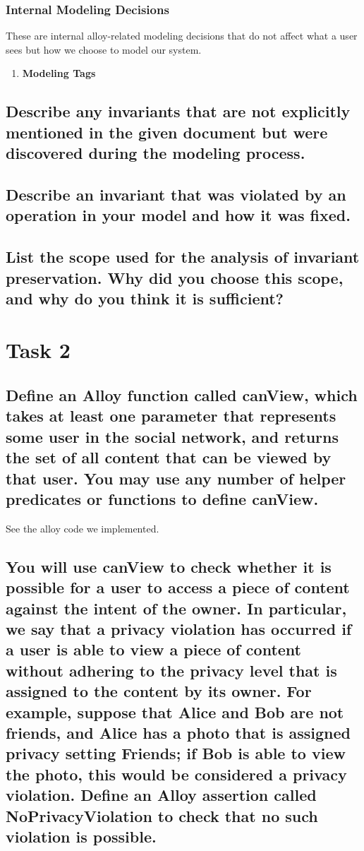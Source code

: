 \documentclass[titlepage]{article}
\begin{document}
\subsubsection{Internal Modeling Decisions}
These are internal alloy-related modeling decisions that do not affect what a user sees but how we choose to model our system.
\begin{enumerate}
	\item \textbf{Modeling Tags}
\end{enumerate}

\subsection{Describe any invariants that are not explicitly mentioned in the given document but were discovered during the modeling process.}
\subsection{Describe an invariant that was violated by an operation in your model and how it was fixed.}
\subsection{List the scope used for the analysis of invariant preservation. Why did you choose this scope, and why do you
	think it is sufficient?}

\section{Task 2}
\subsection{Define an Alloy function called canView, which takes at least one parameter that represents some user in the
	social network, and returns the set of all content that can be viewed by that user. You may use any number of
	helper predicates or functions to define canView.}

See the alloy code we implemented.

\subsection{You will use canView to check whether it is possible for a user to access a piece of content against the intent of the owner. In particular, we say that a privacy violation has occurred if a user is able to view a piece of content without adhering to the privacy level that is assigned to the content by its owner. For example, suppose that Alice
	and Bob are not friends, and Alice has a photo that is assigned privacy setting Friends; if Bob is able to view the
	photo, this would be considered a privacy violation. Define an Alloy assertion called NoPrivacyViolation
	to check that no such violation is possible.}
\end{document}
